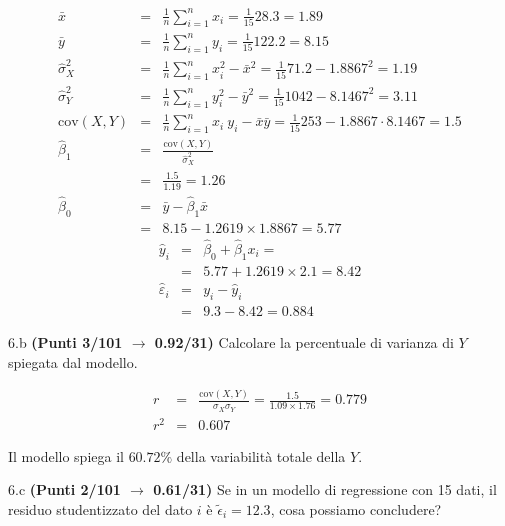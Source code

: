 \documentclass[
  11pt,
]{book}
\theoremstyle{mytheoremstyle}
\theoremstyle{mydefstyle}
\newenvironment{sol}
  {
  \begin{tcolorbox}[enhanced,breakable,arc=0.1mm,boxrule=1pt,colback=white,colframe=iblue,
  title=\bf \fontfamily{lmss}\selectfont \hspace{.5 cm} Soluzione,drop fuzzy shadow]

}{
\end{tcolorbox}
  }
\begin{document}
\begin{sol}
\begin{eqnarray*}
           \bar x &=&\frac 1 n\sum_{i=1}^n x_i = \frac {1}{ 15 }  28.3 =  1.89 \\
           \bar y &=&\frac 1 n\sum_{i=1}^n y_i = \frac {1}{ 15 }  122.2 =  8.15 \\
           \hat\sigma_X^2&=&\frac 1 n\sum_{i=1}^n x_i^2-\bar x^2=\frac {1}{ 15 }  71.2  - 1.8867 ^2= 1.19 \\
           \hat\sigma_Y^2&=&\frac 1 n\sum_{i=1}^n y_i^2-\bar y^2=\frac {1}{ 15 }  1042  - 8.1467 ^2= 3.11 \\
           \text{cov}(X,Y)&=&\frac 1 n\sum_{i=1}^n x_i~y_i-\bar x\bar y=\frac {1}{ 15 }  253 - 1.8867 \cdot 8.1467 = 1.5 \\
           \hat\beta_1 &=& \frac{\text{cov}(X,Y)}{\hat\sigma_X^2} \\
                    &=& \frac{ 1.5 }{ 1.19 }  =  1.26 \\
           \hat\beta_0 &=& \bar y - \hat\beta_1 \bar x\\
                    &=&  8.15 - 1.2619 \times  1.8867 = 5.77 
         \end{eqnarray*}\begin{eqnarray*}
\hat y_i &=&\hat\beta_0+\hat\beta_1 x_i=\\ 
&=& 5.77 + 1.2619 \times 2.1 = 8.42 \\ 
\hat \varepsilon_i &=& y_i-\hat y_i\\ 
&=& 9.3 - 8.42 = 0.884  
\end{eqnarray*}

\end{sol}

6.b \textbf{(Punti 3/101 \(\rightarrow\) 0.92/31)} Calcolare la percentuale di varianza di \(Y\) spiegata dal modello.

\begin{sol}
\begin{eqnarray*}
r&=&\frac{\text{cov}(X,Y)}{\sigma_X\sigma_Y}=\frac{ 1.5 }{ 1.09 \times 1.76 }= 0.779 \\ 
r^2&=& 0.607\end{eqnarray*}

Il modello spiega il \(60.72\%\) della variabilità totale della \(Y\).

\end{sol}

6.c \textbf{(Punti 2/101 \(\rightarrow\) 0.61/31)} Se in un modello di regressione con 15 dati,
il residuo studentizzato del dato \(i\) è \(\tilde \epsilon_i=12.3\), cosa possiamo concludere?
\end{document}

